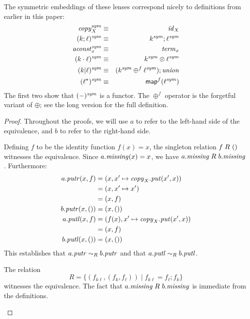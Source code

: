 \begin{defn}[$R$-similarity]
\begin{theorem}
\begin{lemma}
\begin{theorem}[No products]
\begin{lemma}
\begin{defn}
\begin{theorem}
\begin{theorem}
\begin{corollary}[Hylomorphism]
\begin{defn}
\begin{defn}
\begin{defn}[Symmetrization]
\begin{theorem} The symmetric embeddings of these lenses correspond nicely
    to definitions from earlier in this paper:
\setcounter{equation}{0}
\begin{eqnarray}
    \mathit{copy}_X^\mathit{sym}        &\equiv& \mathit{id}_X \\
    (k;\ell)^\mathit{sym}        &\equiv& k^\mathit{sym};\ell^\mathit{sym} \\
    \mathit{aconst}_x^\mathit{sym}       &\equiv& \mathit{term}_x \\
    (k\cdot\ell)^\mathit{sym}    &\equiv& k^\mathit{sym}\otimes\ell^\mathit{sym} \\
    (k|\ell)^\mathit{sym}        &\equiv& (k^\mathit{sym} \oplus^f \ell^\mathit{sym});\mathit{union} \\
    (\ell^\star)^\mathit{sym}     &\equiv& \mathsf{map}^f(\ell^\mathit{sym})
\end{eqnarray}
The first two show that $(-)^\mathit{sym}$ is a functor. \iffull\else The $\oplus^f$ operator is
the forgetful variant of $\oplus$; see the long version for the full
definition.\fi
\end{theorem}

\iffull
\begin{proof} Throughout the proofs, we will use $a$ to refer to the
left-hand side of the equivalence, and $b$ to refer to the right-hand side.

\begin{longenum}
\item Defining $f$ to be the identity function $f(x)=x$, the singleton
relation $f \mathrel{R_{}} {()}$ witnesses the equivalence. Since $a.\mathit{missing}(x) =
x$, we have $a.\mathit{missing} \mathrel{R_{}} b.\mathit{missing}$. Furthermore:
\begin{align*}
    a.\mathit{putr}(x,f) &= (x,x' \mapsto \mathit{copy}_X.\mathit{put}(x',x)) \\
    &= (x, x' \mapsto x') \\
    &= (x, f) \\
    b.\mathit{putr}(x,{()}) &= (x,{()}) \\
    a.\mathit{putl}(x,f) &= (f(x),x' \mapsto \mathit{copy}_X.\mathit{put}(x',x)) \\
    &= (x,f) \\
    b.\mathit{putl}(x,{()}) &= (x,{()})
\end{align*}
This establishes that $a.\mathit{putr} \sim_R b.\mathit{putr}$ and that $a.\mathit{putl} \sim_R
b.\mathit{putl}$.

\item The relation
\[R = \{(f_{k\ell},(f_k,f_\ell)) \mid f_{k\ell} = f_\ell;f_k\}\]
witnesses the equivalence. The fact that $a.\mathit{missing} \mathrel{R_{}} b.\mathit{missing}$ is
immediate from the definitions.


\end{longenum}
\end{proof}
\end{defn}
\end{defn}
\end{defn}
\end{corollary}
\end{theorem}
\end{theorem}
\end{defn}
\end{lemma}
\end{theorem}
\end{lemma}
\end{theorem}
\end{defn}
